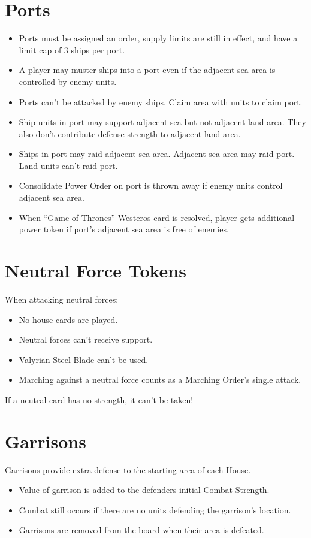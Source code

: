 \documentclass[10pt]{article}
\newenvironment{itemizeCustom}
{\begin{itemize}
  \setlength{\itemsep}{1pt}
  \setlength{\parskip}{0pt}
  \setlength{\parsep}{0pt}}
{\end{itemize}}
\begin{document}
\begin{multicols*}{2}
\section*{Ports}
\begin{itemizeCustom}
	\item Ports must be assigned an order, supply limits are still in effect, and have a limit cap of 3 ships per port.
	\item A player may muster ships into a port even if the adjacent sea area is controlled by enemy units.
	\item Ports can't be attacked by enemy ships. Claim area with units to claim port.
	\item Ship units in port may support adjacent sea but not adjacent land area. They also don't contribute defense strength to adjacent land area.
	\item Ships in port may raid adjacent sea area. Adjacent sea area may raid port. Land units can't raid port.
	\item Consolidate Power Order on port is thrown away if enemy units control adjacent sea area.
	\item When ``Game of Thrones'' Westeros card is resolved, player gets additional power token if port's adjacent sea area is free of enemies. 
\end{itemizeCustom}

\section*{Neutral Force Tokens}
When attacking neutral forces:
\begin{itemizeCustom}
	\item No house cards are played.
	\item Neutral forces can't receive support.
	\item Valyrian Steel Blade can't be used.
	\item Marching against a neutral force counts as a Marching Order's single attack.
\end{itemizeCustom}
If a neutral card has no strength, it can't be taken!

\section*{Garrisons}
Garrisons provide extra defense to the starting area of each House.
\begin{itemizeCustom}
	\item Value of garrison is added to the defenders initial Combat Strength.
	\item Combat still occurs if there are no units defending the garrison's location.
	\item Garrisons are removed from the board when their area is defeated.
\end{itemizeCustom}

\end{multicols*}
\end{document}
